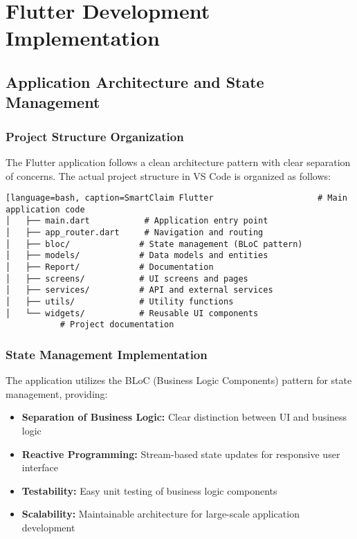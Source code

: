 \documentclass[12pt,a4paper]{report}
\begin{document}
\section{Flutter Development Implementation}

\subsection{Application Architecture and State Management}

\subsubsection{Project Structure Organization}

The Flutter application follows a clean architecture pattern with clear separation of concerns. The actual project structure in VS Code is organized as follows:

\begin{lstlisting}[language=bash, caption=SmartClaim Flutter                     # Main application code
│   ├── main.dart           # Application entry point
│   ├── app_router.dart     # Navigation and routing
│   ├── bloc/              # State management (BLoC pattern)
│   ├── models/            # Data models and entities
│   ├── Report/            # Documentation
│   ├── screens/           # UI screens and pages
│   ├── services/          # API and external services
│   ├── utils/             # Utility functions
│   └── widgets/           # Reusable UI components
           # Project documentation
\end{lstlisting}

\subsubsection{State Management Implementation}

The application utilizes the BLoC (Business Logic Components) pattern for state management, providing:

\begin{itemize}
    \item \textbf{Separation of Business Logic:} Clear distinction between UI and business logic
    \item \textbf{Reactive Programming:} Stream-based state updates for responsive user interface
    \item \textbf{Testability:} Easy unit testing of business logic components
    \item \textbf{Scalability:} Maintainable architecture for large-scale application development
\end{itemize}
\end{document}
